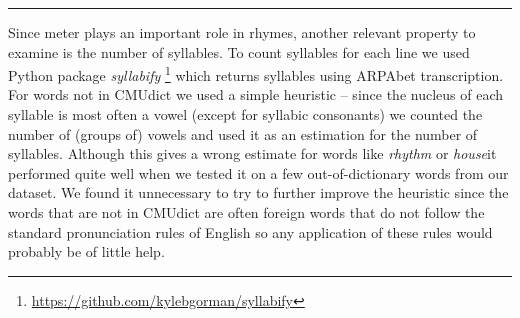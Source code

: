 	
\noindent\rule{14cm}{0.4pt}

Since meter plays an important role in rhymes, another relevant property to examine is the number of syllables. To count syllables for each line we used Python package \textit{syllabify} \footnote{\url{https://github.com/kylebgorman/syllabify}} which returns syllables using ARPAbet transcription. For words not in CMUdict we used a simple heuristic -- since the nucleus of each syllable is most often a vowel (except for syllabic consonants) we counted the number of (groups of) vowels and used it as an estimation for the number of syllables. Although this gives a wrong estimate for words like \textit{rhythm} or \textit{house}it performed quite well when we tested it on a few out-of-dictionary words from our dataset. We found it unnecessary to try to further improve the heuristic since the words that are not in CMUdict are often foreign words that do not follow the standard pronunciation rules of English so any application of these rules would probably be of little help.

